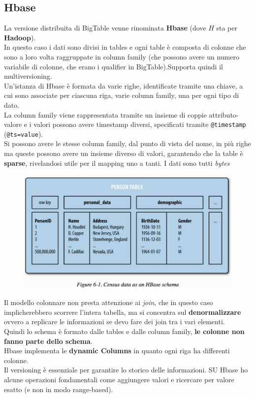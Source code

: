 \subsection{Hbase}
La versione distribuita di BigTable venne rinominata \textbf{Hbase} (dove $H$ sta per \textbf{Hadoop}).\\ In questo caso i dati sono divisi in tables e ogni table è composta di colonne che sono a loro volta raggruppate in column family (che possono avere un numero variabile di colonne, che erano i qualifier in BigTable).Supporta quindi il multiversioning.\\
Un'istanza di Hbase è formata da varie righe, identificate tramite una chiave, a cui sono associate per ciascuna riga, varie column family, una per ogni tipo di dato. \\
La column family viene rappresentata tramite un insieme di coppie attributo-valore e i valori possono avere timestamp diversi, specificati tramite \texttt{@timestamp} (\texttt{@ts=value}).\\ Si possono avere le stesse column family, dal punto di vista del nome, in più righe ma queste possono avere un insieme diverso di valori, garantendo che la table è \textbf{sparse}, rivelandosi utile per il mapping uno a tanti. I dati sono tutti \textit{bytes}\\
\begin{figure}[H]
    \centering
    \includegraphics[scale = 0.26]{Immagini/hbasetable.jpg}
\end{figure}
Il modello colonnare non presta attenzione ai \textit{join}, che in questo caso implicherebbero scorrere l'intera tabella, ma si concentra sul \textbf{denormalizzare} ovvero a replicare le informazioni se devo fare dei join tra i vari elementi.\\
Quindi lo schema è formato dalle tables e dalle column family, \textbf{le colonne non fanno parte dello schema}.\\ 
Hbase implementa le \textbf{dynamic Columns} in quanto ogni riga ha differenti colonne.\\ Il versioning è essenziale per garantire lo storico delle informazioni. SU Hbase ho alcune operazioni fondamentali come aggiungere valori e ricercare per valore esatto (e non in modo range-based).\\


